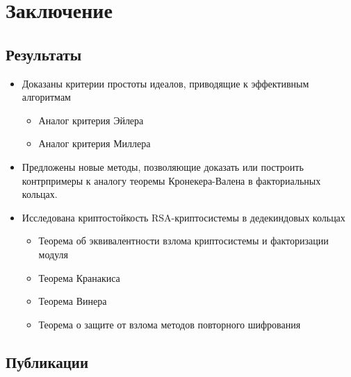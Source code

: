\documentclass[8pt, xcolor=x11names]{beamer}
\begin{document}
\section{Заключение}

\subsection{Результаты}

\begin{frame}
    \begin{block_notitle}{}
        \begin{itemize}
            \item Доказаны критерии простоты идеалов, приводящие к эффективным алгоритмам
            \begin{itemize}
                \item Аналог критерия Эйлера
                
                \item Аналог критерия Миллера
            \end{itemize}
            
            \item Предложены новые методы, позволяющие доказать или построить контрпримеры к аналогу теоремы Кронекера-Валена в факториальных кольцах.
            
            \item Исследована криптостойкость RSA-криптосистемы в дедекиндовых кольцах
            \begin{itemize}
                \item Теорема об эквивалентности взлома криптосистемы и факторизации модуля
                
                \item Теорема Кранакиса
                
                \item Теорема Винера
                
                \item Теорема о защите от взлома методов повторного шифрования
            \end{itemize}
        \end{itemize}
    \end{block_notitle}
\end{frame}

\subsection{Публикации}
\end{document}
